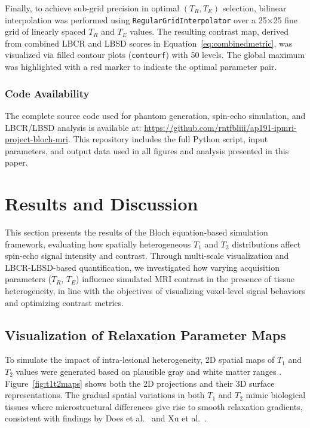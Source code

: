 \documentclass[10pt,a4paper,twoside]{article}
\begin{document}
Finally, to achieve sub-grid precision in optimal  \( (T_R, T_E) \) selection, bilinear interpolation was performed using \texttt{RegularGridInterpolator} over a 25×25 fine grid of linearly spaced $T_R$ and $T_E$ values. The resulting contrast map, derived from combined LBCR and LBSD scores in Equation~\eqref{eq:combinedmetric}, was visualized via filled contour plots (\texttt{contourf}) with 50 levels. The global maximum was highlighted with a red marker to indicate the optimal parameter pair.

\subsubsection{Code Availability}
The complete source code used for phantom generation, spin-echo simulation, and LBCR/LBSD analysis is available at: \url{https://github.com/rntfbliii/ap191-ipmri-project-bloch-mri}. This repository includes the full Python script, input parameters, and output data used in all figures and analysis presented in this paper.



\section{Results and Discussion}\label{sec:rnd}

This section presents the results of the Bloch equation-based simulation framework, evaluating how spatially heterogeneous $ T_1 $ and $ T_2 $ distributions affect spin-echo signal intensity and contrast. Through multi-scale visualization and LBCR-LBSD-based quantification, we investigated how varying acquisition parameters ($T_R$, $T_E$) influence simulated MRI contrast in the presence of tissue heterogeneity, in line with the objectives of visualizing voxel-level signal behaviors and optimizing contrast metrics.

\subsection{Visualization of Relaxation Parameter Maps}

To simulate the impact of intra-lesional heterogeneity, 2D spatial maps of $ T_1 $ and $ T_2 $ values were generated based on plausible gray and white matter ranges \cite{stanisz2005, bojorquez2017}. Figure~\ref{fig:t1t2maps} shows both the 2D projections and their 3D surface representations. The gradual spatial variations in both $ T_1 $ and $ T_2 $ mimic biological tissues where microstructural differences give rise to smooth relaxation gradients, consistent with findings by Does et al.\ \cite{does2002} and Xu et al.\ \cite{xu2009}.
\end{document}
